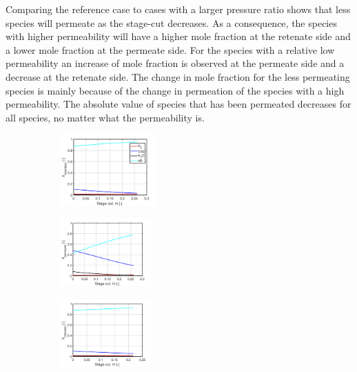 Comparing the reference case to cases with a larger pressure ratio shows that less species will permeate as the stage-cut decreases. As a consequence, the species with higher permeability will have a higher mole fraction at the retenate side and a lower mole fraction at the permeate side. For the species with a relative low permeability an increase of mole fraction is observed at the permeate side and a decrease at the retenate side. The change in mole fraction for the less permeating species is mainly because of the change in permeation of the species with a high permeability. The absolute value of species that has been permeated decreases for all species, no matter what the permeability is.
\begin{figure}[H]
\centering
	\begin{subfigure}[]
		\centering
		\includegraphics[width = 0.4\textwidth]{Images/case0_retenate.png}
	\end{subfigure}
	\begin{subfigure}[]
		\centering
		\includegraphics[width = 0.38\textwidth]{Images/case0_permeate.png}
	\end{subfigure}
	\begin{subfigure}[]
		\centering
		\includegraphics[width = 0.38\textwidth]{Images/case_A1_retenate.png}
	\end{subfigure}

\end{figure}
